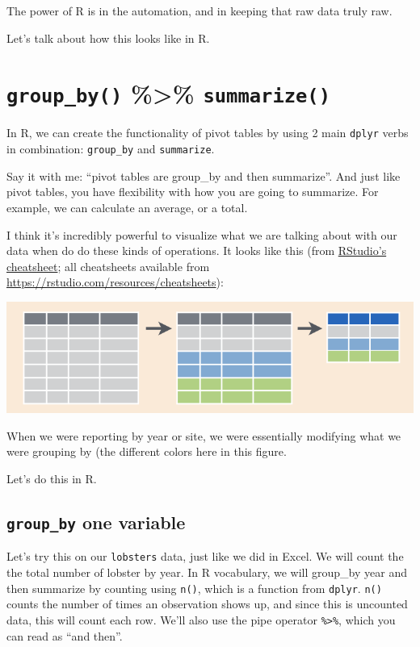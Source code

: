 \documentclass[]{book}
\begin{document}
The power of R is in the automation, and in keeping that raw data truly raw.

Let's talk about how this looks like in R.

\hypertarget{group_by-summarize}{%
\section{\texorpdfstring{\texttt{group\_by()} \%\textgreater{}\% \texttt{summarize()}}{group\_by() \%\textgreater{}\% summarize()}}\label{group_by-summarize}}

In R, we can create the functionality of pivot tables by using 2 main \texttt{dplyr} verbs in combination: \texttt{group\_by} and \texttt{summarize}.

Say it with me: ``pivot tables are group\_by and then summarize''. And just like pivot tables, you have flexibility with how you are going to summarize. For example, we can calculate an average, or a total.

I think it's incredibly powerful to visualize what we are talking about with our data when do do these kinds of operations. It looks like this (from \href{http://www.rstudio.com/wp-content/uploads/2015/02/data-wrangling-cheatsheet.pdf}{RStudio's cheatsheet}; all cheatsheets available from \url{https://rstudio.com/resources/cheatsheets}):

\includegraphics[width=0.8\linewidth]{img/rstudio-cheatsheet-group_by_summarize}

When we were reporting by year or site, we were essentially modifying what we were grouping by (the different colors here in this figure.

Let's do this in R.

\hypertarget{group_by-one-variable}{%
\subsection{\texorpdfstring{\texttt{group\_by} one variable}{group\_by one variable}}\label{group_by-one-variable}}

Let's try this on our \texttt{lobsters} data, just like we did in Excel. We will count the the total number of lobster by year. In R vocabulary, we will group\_by year and then summarize by counting using \texttt{n()}, which is a function from \texttt{dplyr}. \texttt{n()} counts the number of times an observation shows up, and since this is uncounted data, this will count each row. We'll also use the pipe operator \texttt{\%\textgreater{}\%}, which you can read as ``and then''.
\end{document}
